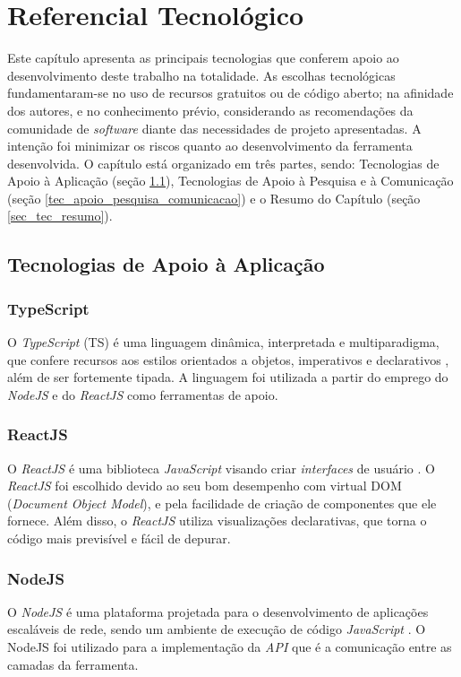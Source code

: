 \chapter[Referencial Tecnológico]{Referencial Tecnológico}

\label{chap:referencial_tecnologico}

Este capítulo apresenta as principais tecnologias que conferem apoio ao desenvolvimento deste trabalho na totalidade. As escolhas tecnológicas fundamentaram-se no uso de recursos gratuitos ou de código aberto; na afinidade dos autores, e no conhecimento prévio, considerando as recomendações da comunidade de \textit{software} diante das necessidades de projeto apresentadas. A intenção foi minimizar os riscos quanto ao desenvolvimento da ferramenta desenvolvida. O capítulo está organizado em três partes, sendo: Tecnologias de Apoio à Aplicação (seção \ref{tec_apoio_app}), Tecnologias de Apoio à Pesquisa e à Comunicação (seção \ref{tec_apoio_pesquisa_comunicacao}) e o Resumo do Capítulo (seção \ref{sec_tec_resumo}).


\section{Tecnologias de Apoio à Aplicação}

\label{tec_apoio_app}

\subsection{TypeScript}
O \textit{TypeScript} (TS) é uma linguagem dinâmica, interpretada e multiparadigma, que confere recursos aos estilos orientados a objetos, imperativos e declarativos \cite{typescript}, além de ser fortemente tipada. A linguagem foi utilizada a partir do emprego do \textit{NodeJS} e do \textit{ReactJS} como ferramentas de apoio.

\subsection{ReactJS}
O \textit{ReactJS} é uma biblioteca \textit{JavaScript} visando criar \textit{interfaces} de usuário \cite{reactjs}. O \textit{ReactJS} foi escolhido devido ao seu bom desempenho com virtual DOM (\textit{Document Object Model}), e pela facilidade de criação de componentes que ele fornece. Além disso, o \textit{ReactJS} utiliza visualizações declarativas, que torna o código mais previsível e fácil de depurar.

\subsection{NodeJS}
O \textit{NodeJS} é uma plataforma projetada para o desenvolvimento de aplicações escaláveis de rede, sendo um ambiente de execução de código \textit{JavaScript} \cite{nodejs}. O NodeJS foi utilizado para a implementação da \textit{API} que é a comunicação entre as camadas da ferramenta.

